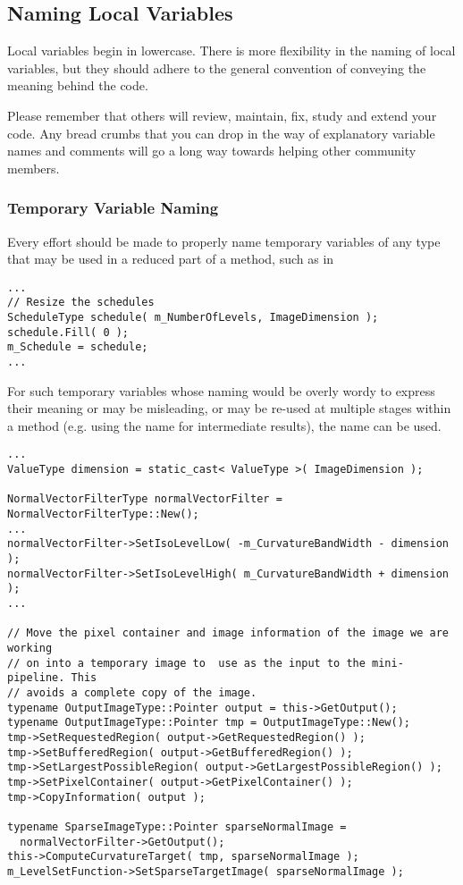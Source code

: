 \subsection{Naming Local Variables}
\label{subsec:NamingLocalVariables}

Local variables begin in lowercase. There is more flexibility in the naming of
local variables, but they should adhere to the general convention of conveying
the meaning behind the code.

Please remember that others will review, maintain, fix, study and extend your
code. Any bread crumbs that you can drop in the way of explanatory variable
names and comments will go a long way towards helping other community members.


\subsubsection{Temporary Variable Naming}
\label{subsubsec:TemporaryVariableNaming}

Every effort should be made to properly name temporary variables of any type
that may be used in a reduced part of a method, such as in
\small
\begin{verbatim}
...
// Resize the schedules
ScheduleType schedule( m_NumberOfLevels, ImageDimension );
schedule.Fill( 0 );
m_Schedule = schedule;
...
\end{verbatim}
\normalsize

For such temporary variables whose naming would be overly wordy to
express their meaning or may be misleading, or may be re-used at multiple
stages within a method (e.g. using the name  for intermediate
results), the name  can be used.
\small
\begin{verbatim}
...
ValueType dimension = static_cast< ValueType >( ImageDimension );

NormalVectorFilterType normalVectorFilter = NormalVectorFilterType::New();
...
normalVectorFilter->SetIsoLevelLow( -m_CurvatureBandWidth - dimension );
normalVectorFilter->SetIsoLevelHigh( m_CurvatureBandWidth + dimension );
...

// Move the pixel container and image information of the image we are working
// on into a temporary image to  use as the input to the mini-pipeline. This
// avoids a complete copy of the image.
typename OutputImageType::Pointer output = this->GetOutput();
typename OutputImageType::Pointer tmp = OutputImageType::New();
tmp->SetRequestedRegion( output->GetRequestedRegion() );
tmp->SetBufferedRegion( output->GetBufferedRegion() );
tmp->SetLargestPossibleRegion( output->GetLargestPossibleRegion() );
tmp->SetPixelContainer( output->GetPixelContainer() );
tmp->CopyInformation( output );

typename SparseImageType::Pointer sparseNormalImage =
  normalVectorFilter->GetOutput();
this->ComputeCurvatureTarget( tmp, sparseNormalImage );
m_LevelSetFunction->SetSparseTargetImage( sparseNormalImage );
\end{verbatim}
\normalsize


